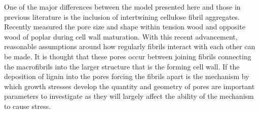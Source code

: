 One of the major differences between the model presented here and those in previous
literature is the inclusion of intertwining cellulose fibril aggregates. Recently \cite{Chang_2014} measured the pore size and shape within tension wood and opposite
wood of poplar during cell wall maturation. With this recent advancement,
reasonable assumptions around how regularly fibrils interact with each other can be made. It is thought that these pores
occur between joining fibrils connecting the macrofibrils into the larger
structure that is the forming cell wall. If the deposition of lignin into the
pores forcing the fibrils apart is the mechanism by which growth stresses
develop the quantity and geometry of pores are important parameters to
investigate as they will largely affect the ability of the mechanism to cause
stress.